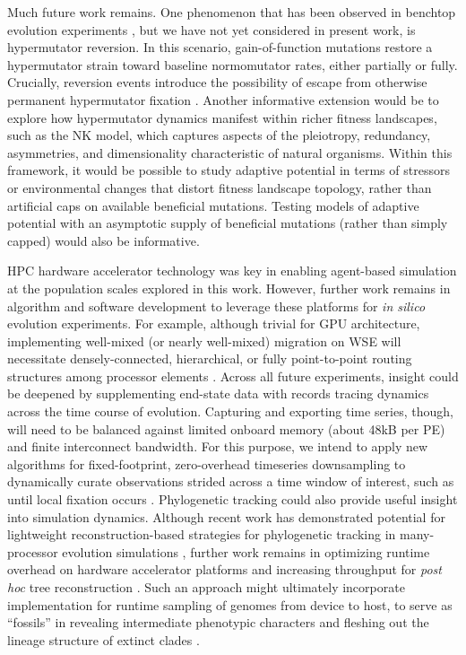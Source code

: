 Much future work remains.
One phenomenon that has been observed in benchtop evolution experiments \citep{ho2021evolutionary}, but we have not yet considered in present work, is hypermutator reversion.
In this scenario, gain-of-function mutations restore a hypermutator strain toward baseline normomutator rates, either partially or fully.
Crucially, reversion events introduce the possibility of escape from otherwise permanent hypermutator fixation \citep{taddei1997role}.
Another informative extension would be to explore how hypermutator dynamics manifest within richer fitness landscapes, such as the NK model, which captures aspects of the pleiotropy, redundancy, asymmetries, and dimensionality characteristic of natural organisms.
Within this framework, it would be possible to study adaptive potential in terms of stressors or environmental changes that distort fitness landscape topology, rather than artificial caps on available beneficial mutations.
Testing models of adaptive potential with an asymptotic supply of beneficial mutations (rather than simply capped) would also be informative.

HPC hardware accelerator technology was key in enabling agent-based simulation at the population scales explored in this work.
However, further work remains in algorithm and software development to leverage these platforms for \textit{in silico} evolution experiments.
For example, although trivial for GPU architecture, implementing well-mixed (or nearly well-mixed) migration on WSE will necessitate densely-connected, hierarchical, or fully point-to-point routing structures among processor elements \citep{james2020physical,luczynski2024near}.
Across all future experiments, insight could be deepened by supplementing end-state data with records tracing dynamics across the time course of evolution.
Capturing and exporting time series, though, will need to be balanced against limited onboard memory (about 48kB per PE) and finite interconnect bandwidth.
For this purpose, we intend to apply new algorithms for fixed-footprint, zero-overhead timeseries downsampling to dynamically curate observations strided across a time window of interest, such as until local fixation occurs \citep{moreno2024structured}.
Phylogenetic tracking could also provide useful insight into simulation dynamics.
Although recent work has demonstrated potential for lightweight reconstruction-based strategies for phylogenetic tracking in many-processor evolution simulations \citep{moreno2022hereditary}, further work remains in optimizing runtime overhead on hardware accelerator platforms and increasing throughput for \textit{post hoc} tree reconstruction \citep{moreno2024trackable,moreno2024analysis}.
Such an approach might ultimately incorporate implementation for runtime sampling of genomes from device to host, to serve as ``fossils'' in revealing intermediate phenotypic characters and fleshing out the lineage structure of extinct clades \citep{moreno2024guide}.


